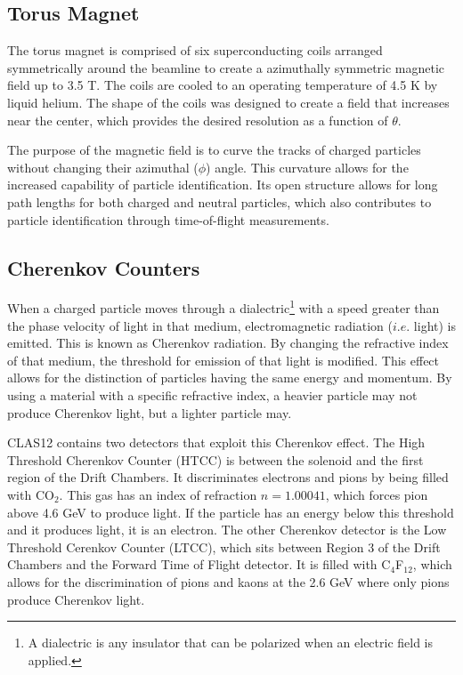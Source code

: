 \subsection{Torus Magnet}
The torus magnet is comprised of six superconducting coils arranged symmetrically around the beamline to create a azimuthally symmetric magnetic field up to 3.5 T. The coils are cooled to an operating temperature of 4.5 K by liquid helium. The shape of the coils was designed to create a field that increases near the center, which provides the desired resolution as a function of $\theta$.

The purpose of the magnetic field is to curve the tracks of charged particles without changing their azimuthal ($\phi$) angle. This curvature allows for the increased capability of particle identification. Its open structure allows for long path lengths for both charged and neutral particles, which also contributes to particle identification through time-of-flight measurements.

\subsection{Cherenkov Counters}
When a charged particle moves through a dialectric\footnote{A dialectric is any insulator that can be polarized when an electric field is applied.} with a speed greater than the phase velocity of light in that medium, electromagnetic radiation ($i.e.$ light) is emitted. This is known as Cherenkov radiation. By changing the refractive index of that medium, the threshold for emission of that light is modified. This effect allows for the distinction of particles having the same energy and momentum. By using a material with a specific refractive index, a heavier particle may not produce Cherenkov light, but a lighter particle may.

CLAS12 contains two detectors that exploit this Cherenkov effect. The High Threshold Cherenkov Counter (HTCC) is between the solenoid and the first region of the Drift Chambers. It discriminates electrons and pions by being filled with CO$_2$. This gas has an index of refraction $n=1.00041$, which forces pion above 4.6 GeV to produce light. If the particle has an energy below this threshold and it produces light, it is an electron. The other Cherenkov detector is the Low Threshold Cerenkov Counter (LTCC), which sits between Region 3 of the Drift Chambers and the Forward Time of Flight detector. It is filled with C$_4$F$_12$, which allows for the discrimination of pions and kaons at the 2.6 GeV where only pions produce Cherenkov light.

